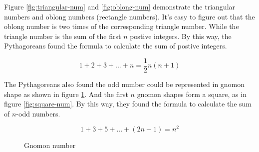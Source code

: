 \documentclass{article}
\begin{document}
Figure \ref{fig:triangular-num} and \ref{fig:oblong-num} demonstrate the triangular numbers and oblong numbers (rectangle numbers). It's easy to figure out that the oblong number is two times of the corresponding triangle number. While the triangle number is the sum of the first $n$ postive integers. By this way, the Pythagoreans found the formula to calculate the sum of postive integers.

\[
1 + 2 + 3 + ... + n = \frac{1}{2}n(n+1)
\]

The Pythagoreans also found the odd number could be represented in gnomon shape as shown in figure \ref{fig:gnomon-num}. And the first $n$ gnomon shapes form a square, as in figure \ref{fig:square-num}. By this way, they found the formula to calculate the sum of $n$-odd numbers.

\[
1 + 3 + 5 + ... + (2n - 1) = n^2
\]

\begin{figure}[htbp]
\centering
{}
\caption{Gnomon number}
\label{fig:gnomon-num}
\end{figure}
\end{document}

